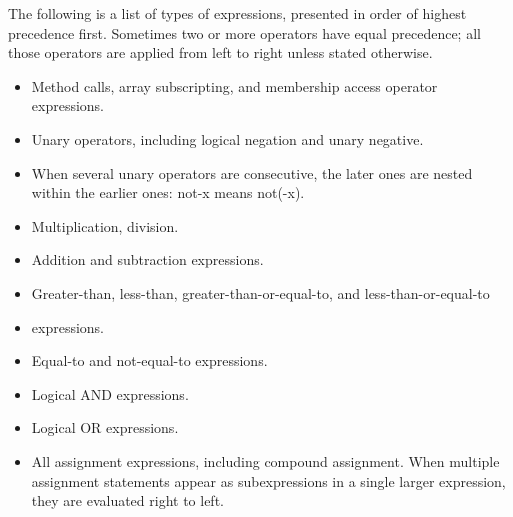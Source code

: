 \begin{homeworkProblem}
	The following is a list of types of expressions, presented in order of highest precedence first. Sometimes two or more operators have equal precedence; all those operators are applied from left to right unless stated otherwise.
	
	\begin{itemize}
		\item Method calls, array subscripting, and membership access operator expressions.
		\item Unary operators, including logical negation and unary negative.
		\item When several unary operators are consecutive, the later ones are nested within the earlier ones: not-x means not(-x).
		\item Multiplication, division.
		\item Addition and subtraction expressions.
		\item Greater-than, less-than, greater-than-or-equal-to, and less-than-or-equal-to
		\item expressions.
		\item Equal-to and not-equal-to expressions.
		\item Logical AND expressions.
		\item Logical OR expressions.
		\item All assignment expressions, including compound assignment. When multiple assignment statements appear as subexpressions in a single larger expression, they are evaluated right to left.
	\end{itemize}

	
\end{homeworkProblem}